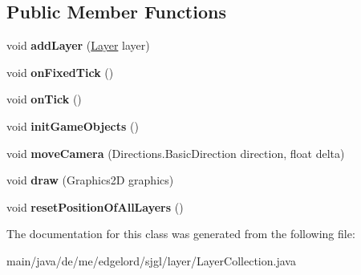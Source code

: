\subsection*{Public Member Functions}
\begin{DoxyCompactItemize}
\item 
\mbox{\label{classde_1_1me_1_1edgelord_1_1sjgl_1_1layer_1_1_layer_collection_a07b8b83c92e301e2702b279a33c06125}} 
void {\bfseries add\+Layer} (\mbox{\hyperlink{classde_1_1me_1_1edgelord_1_1sjgl_1_1layer_1_1_layer}{Layer}} layer)
\item 
\mbox{\label{classde_1_1me_1_1edgelord_1_1sjgl_1_1layer_1_1_layer_collection_afc9021437f9417365ca15ec174c8ca66}} 
void {\bfseries on\+Fixed\+Tick} ()
\item 
\mbox{\label{classde_1_1me_1_1edgelord_1_1sjgl_1_1layer_1_1_layer_collection_a0da340df6626d6028e9de566adb59456}} 
void {\bfseries on\+Tick} ()
\item 
\mbox{\label{classde_1_1me_1_1edgelord_1_1sjgl_1_1layer_1_1_layer_collection_a22919ce1c6972d3ba9ac319abdc02822}} 
void {\bfseries init\+Game\+Objects} ()
\item 
\mbox{\label{classde_1_1me_1_1edgelord_1_1sjgl_1_1layer_1_1_layer_collection_af5cda4e9ebffe970dd52a56087724e06}} 
void {\bfseries move\+Camera} (Directions.\+Basic\+Direction direction, float delta)
\item 
\mbox{\label{classde_1_1me_1_1edgelord_1_1sjgl_1_1layer_1_1_layer_collection_ace2d3915b99b918a097e2aeaf3d08082}} 
void {\bfseries draw} (Graphics2D graphics)
\item 
\mbox{\label{classde_1_1me_1_1edgelord_1_1sjgl_1_1layer_1_1_layer_collection_a825346a116c876c8d6efae0ed1bb665c}} 
void {\bfseries reset\+Position\+Of\+All\+Layers} ()
\end{DoxyCompactItemize}


The documentation for this class was generated from the following file\+:\begin{DoxyCompactItemize}
\item 
main/java/de/me/edgelord/sjgl/layer/Layer\+Collection.\+java\end{DoxyCompactItemize}
